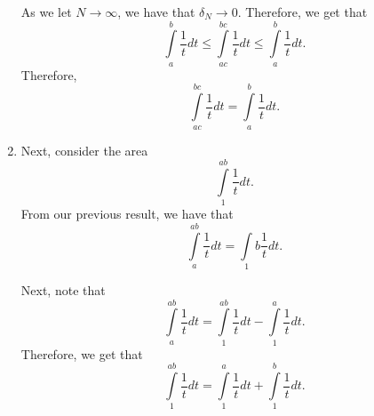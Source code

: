 \begin{enumerate}
As we let \(N \to \infty\), we have that \(\delta_N \to 0\). Therefore, we get that
\begin{equation}
\int\limits_a^b \frac{1}{t} dt \leq \int\limits_{ac}^{bc} \frac{1}{t} dt
    \leq \int\limits_a^b \frac{1}{t} dt.
\end{equation}
Therefore,
\begin{equation}
\int\limits_{ac}^{bc} \frac{1}{t} dt = \int\limits_a^b \frac{1}{t} dt.
\end{equation}

\item Next, consider the area
\begin{equation}
\int\limits_1^{ab} \frac{1}{t} dt.
\end{equation} 
From our previous result, we have that
\begin{equation}
\int\limits_{a}^{ab} \frac{1}{t} dt = \int\limits_{1}{b} \frac{1}{t} dt.
\end{equation}

Next, note that 
\begin{equation}
\int\limits_a^{ab} \frac{1}{t} dt = \int\limits_1^{ab} \frac{1}{t} dt - \int\limits_1^a \frac{1}{t} dt.
\end{equation}
Therefore, we get that
\begin{equation}
\int\limits_1^{ab} \frac{1}{t} dt = \int\limits_1^a \frac{1}{t} dt + \int\limits_1^b \frac{1}{t} dt.
\end{equation}

\end{enumerate}
